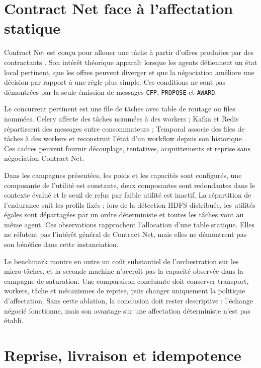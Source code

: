 \section{Contract Net face à l'affectation statique}

Contract Net est conçu pour allouer une tâche à partir d'offres produites par des
contractants \cite{smith1980contract,fipa2002contractnet}. Son intérêt théorique apparaît
lorsque les agents détiennent un état local pertinent, que les offres peuvent diverger et
que la négociation améliore une décision par rapport à une règle plus simple. Ces
conditions ne sont pas démontrées par la seule émission de messages
\texttt{CFP}, \texttt{PROPOSE} et \texttt{AWARD}.

Le concurrent pertinent est une file de tâches avec table de routage ou files nommées.
Celery affecte des tâches nommées à des workers ; Kafka et Redis répartissent des messages
entre consommateurs ; Temporal associe des files de tâches à des workers et reconstruit
l'état d'un workflow depuis son historique
\cite{celery2026tasks,kafka2026semantics,redis2026streams,temporal2026tasks}. Ces cadres
peuvent fournir découplage, tentatives, acquittements et reprise sans négociation
Contract Net.

Dans les campagnes présentées, les poids et les capacités sont configurés, une composante
de l'utilité est constante, deux composantes sont redondantes dans le contexte évalué et
le seuil de refus par faible utilité est inactif. La répartition de l'endurance suit les
profils fixés ; lors de la détection HDFS distribuée, les utilités égales sont départagées
par un ordre déterministe et toutes les tâches vont au même agent. Ces observations
rapprochent l'allocation d'une table statique. Elles ne réfutent pas l'intérêt général de
Contract Net, mais elles ne démontrent pas son bénéfice dans cette instanciation.

Le benchmark montre en outre un coût substantiel de l'orchestration sur les micro-tâches,
et la seconde machine n'accroît pas la capacité observée dans la campagne de saturation.
Une comparaison concluante doit conserver transport, workers, tâche et mécanismes de
reprise, puis changer uniquement la politique d'affectation. Sans cette ablation, la
conclusion doit rester descriptive : l'échange négocié fonctionne, mais son avantage sur
une affectation déterministe n'est pas établi.

\section{Reprise, livraison et idempotence}

